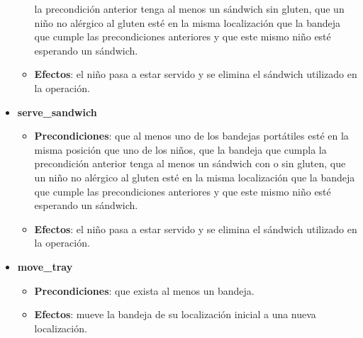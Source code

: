 \documentclass{article}
\begin{document}
\begin{itemize}
\begin{itemize}
            la precondición anterior tenga al menos un sándwich sin gluten, que
            un niño no alérgico al gluten esté en la misma localización que la
            bandeja que cumple las precondiciones anteriores y que este mismo niño esté esperando un sándwich.
            \item \textbf{Efectos}: el niño pasa a estar servido y se elimina el sándwich utilizado en la operación.
        \end{itemize}
    \item \textbf{serve\_sandwich}
        \begin{itemize}
            \item \textbf{Precondiciones}: que al menos uno de los bandejas portátiles esté
            en la misma posición que uno de los niños, que la bandeja que cumpla la
            precondición anterior tenga al menos un sándwich con o sin gluten,
            que un niño no alérgico al gluten esté en la misma localización que la
            bandeja que cumple las precondiciones anteriores y que este mismo
            niño esté esperando un sándwich.
            \item \textbf{Efectos}: el niño pasa a estar servido y se elimina el sándwich
            utilizado en la operación.
        \end{itemize}
    \item \textbf{move\_tray}
        \begin{itemize}
            \item \textbf{Precondiciones}: que exista al menos un bandeja.
            \item \textbf{Efectos}: mueve la bandeja de su localización inicial a una nueva
            localización.
        \end{itemize}
    
\end{itemize}
\end{document}
